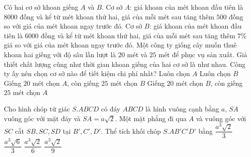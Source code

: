\begin{ex}%
Có hai cơ sở khoan giếng $A$ và $B$. Cơ sở $A$: giá khoan của mét khoan đầu tiên là $8000$ đồng và kể từ mét khoan thứ hai, giá của mỗi mét sau tăng thêm $500$ đồng so với giá của mét khoan ngay trước đó.  Cơ sở $B$: giá khoan của mét khoan đầu tiên là $6000$ đồng và kể từ mét khoan thứ hai, giá của mỗi mét sau tăng thêm $7\%$ giá so với giá của mét khoan ngay trước đó. Một công ty  giống cây muốn thuê khoan hai giếng với độ sâu lần lượt là $20$ mét và $25$ mét để phục vụ sản xuất. Giả thiết chất lượng cũng như thời gian khoan giếng của hai cơ sở là như nhau. Công ty ấy nên chọn cơ sở nào để tiết kiệm chi phí nhất?
\choice
{Luôn chọn $A$}
{Luôn chọn $B$}
{Giếng $20$ mét chọn $A$, còn giếng $25$ mét chọn $B$}
{\True Giếng $20$ mét chọn $B$, còn giếng $25$ mét chọn $A$}
\end{ex}

\begin{ex}%
Cho hình chóp tứ giác $S.ABCD$ có đáy $ABCD$ là hình vuông cạnh bằng $a$, $SA$ vuông góc với mặt đáy và $SA=a\sqrt{2}$. Một mặt phẳng đi qua $A$ và vuông góc với $SC$ cắt $SB,SC,SD$ tại $B',C',D'$. Thể tích khối chóp $S.AB'C'D'$ bằng
\choice
{$\dfrac{a^3\sqrt{2}}{3}$}
{$\dfrac{a^3\sqrt{6}}{3}$}
{$\dfrac{a^3\sqrt{2}}{6}$}
{\True $\dfrac{a^3\sqrt{2}}{9}$}
\end{ex}

